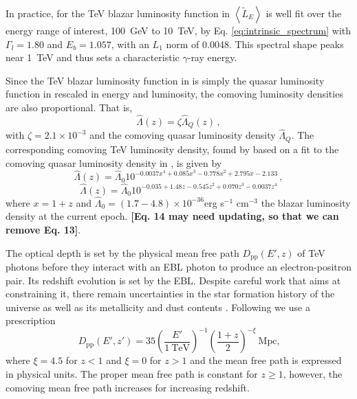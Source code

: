 \documentclass[numberedappendix]{emulateapj}
\newcommand\ALc[1]{{\color{red} \bf #1}} %
\begin{document}
In practice, for the TeV blazar luminosity function in
\citet{2014ApJ...790..137B} $\left< \tilde{L}_E \right>$ is well fit
over the energy range of interest, 100~GeV to 10~TeV, by
Eq. \ref{eq:intrinsic_spectrum} with $\Gamma_l=1.80$ and $E_b=1.057$,
with an $L_1$ norm of 0.0048.  This spectral shape peaks near 1~TeV
and thus sets a characteristic $\gamma$-ray energy.

Since the TeV blazar luminosity function in
\citet{2014ApJ...790..137B} is simply the quasar luminosity function
in \citet{2007ApJ...654..731H} rescaled in energy and luminosity, the
comoving luminosity densities are also proportional.  That is,
\begin{equation}
\hat{\Lambda}(z) = \zeta \hat{\Lambda}_Q(z)\,,
\end{equation}
with $\zeta=2.1\times 10^{-3}$ and the comoving quasar luminosity
density $\hat{\Lambda}_Q$. The corresponding comoving TeV luminosity
density, found by \citet{2012ApJ...752...23C} based on a fit to the
comoving quasar luminosity density in \citet{2007ApJ...654..731H}, is
given by
\begin{equation}
\label{eq:phi_quasar}
\hat{\Lambda}(z)=\hat{\Lambda}_0 10^{-0.0037x^4+0.085x^3-0.778x^2+2.795x-2.133}\,,
\end{equation}
\begin{equation}
\label{eq:phi_quasar}
\hat{\Lambda}(z)=\hat{\Lambda}_0 10^{-0.035+1.48z-0.545z^2+0.070z^3-0.0037z^4}
\end{equation}
where $x=1+z$ and
$\hat{\Lambda}_0=(1.7-4.8)\times 10^{-36}$erg s$^{-1}$ cm$^{-3}$ the
blazar luminosity density at the current epoch. 
\ALc{[{Eq. 14 may need updating, so that we can remove Eq. 13}]}.



The optical depth is set by the physical mean free path $D_\mathrm{pp}(E',z)$ of TeV photons before they interact with an EBL photon to produce an electron-positron pair. Its redshift evolution is set by the EBL. Despite careful work that aims at constraining it, there remain uncertainties in the star formation history of the universe as well as its metallicity and dust contents \citep[see, e.g.][]{2008A&A...487..837F,2006ApJ...648..774S}. Following \citet{2012ApJ...752...23C} we use a prescription
\begin{equation}
\label{eq:mean_free_path}
D_{\mathrm{pp}}(E',z')=35\left(\frac{E'}{1~\textrm{TeV}}\right)^{-1} \left(\frac{1+z}{2}\right)^{-\xi}~\textrm{Mpc,}
\end{equation}
where $\xi=4.5$ for $z<1$ and $\xi=0$ for $z>1$ \citep{2004A&A...413..807K,2009PhRvD..80l3012N} and the mean free path is expressed in physical units. The proper mean free path is constant for $z\geq 1$, however, the comoving mean free path increases for increasing redshift.
\end{document}

